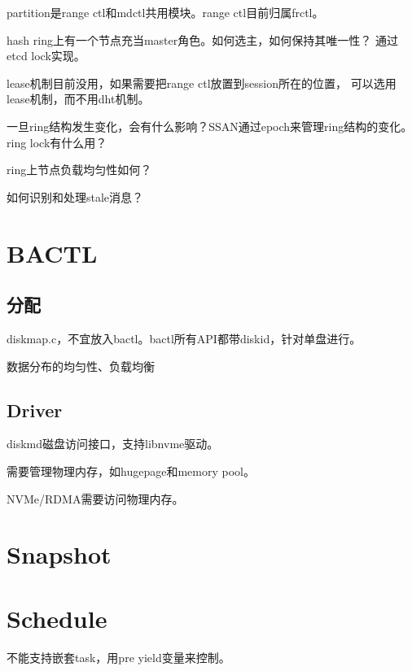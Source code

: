 partition是range ctl和mdctl共用模块。range ctl目前归属frctl。

hash ring上有一个节点充当master角色。如何选主，如何保持其唯一性？
通过etcd lock实现。

lease机制目前没用，如果需要把range ctl放置到session所在的位置，
可以选用lease机制，而不用dht机制。

一旦ring结构发生变化，会有什么影响？SSAN通过epoch来管理ring结构的变化。
ring lock有什么用？

ring上节点负载均匀性如何？

如何识别和处理stale消息？

\section{BACTL}

\subsection{分配}

diskmap.c，不宜放入bactl。bactl所有API都带diskid，针对单盘进行。

数据分布的均匀性、负载均衡

\subsection{Driver}

diskmd磁盘访问接口，支持libnvme驱动。

需要管理物理内存，如hugepage和memory pool。

NVMe/RDMA需要访问物理内存。

\section{Snapshot}

\section{Schedule}

不能支持嵌套task，用pre yield变量来控制。
